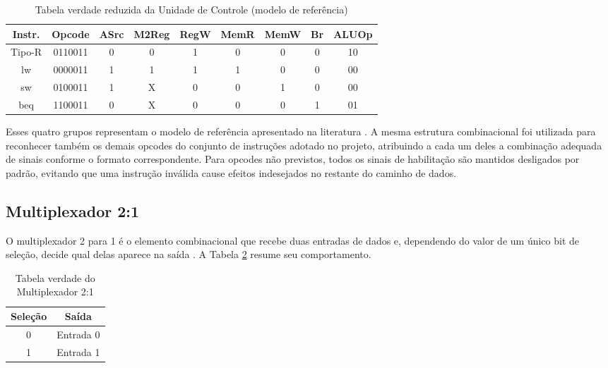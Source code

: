 \documentclass[conference]{IEEEtran}
\begin{document}
\begin{table}[!t]
\caption{Tabela verdade reduzida da Unidade de Controle (modelo de referência)}
\begin{center}
\scriptsize
\setlength{\tabcolsep}{3pt}
\begin{tabular}{c|c|c|c|c|c|c|c|c}
\hline \hline
\textbf{Instr.} & \textbf{Opcode} & \textbf{ASrc} & \textbf{M2Reg} & \textbf{RegW} & \textbf{MemR} & \textbf{MemW} & \textbf{Br} & \textbf{ALUOp} \\
\hline
Tipo-R & 0110011 & 0 & 0 & 1 & 0 & 0 & 0 & 10 \\
lw & 0000011 & 1 & 1 & 1 & 1 & 0 & 0 & 00 \\
sw & 0100011 & 1 & X & 0 & 0 & 1 & 0 & 00 \\
beq & 1100011 & 0 & X & 0 & 0 & 0 & 1 & 01 \\
\hline \hline
\end{tabular}
\end{center}
\label{tab:controle}
\end{table}

Esses quatro grupos representam o modelo de referência apresentado na literatura \cite{patterson2020computer}. A
mesma estrutura combinacional foi utilizada para reconhecer também os demais opcodes do conjunto de
instruções adotado no projeto, atribuindo a cada um deles a combinação adequada de sinais conforme o
formato correspondente. Para opcodes não previstos, todos os sinais de habilitação são mantidos desligados
por padrão, evitando que uma instrução inválida cause efeitos indesejados no restante do caminho de dados.

\subsection{Multiplexador 2:1}
O multiplexador 2 para 1 é o elemento combinacional que recebe
duas entradas de dados e, dependendo do valor de um único bit de seleção, decide qual delas aparece na
saída \cite{patterson2020computer}. A Tabela \ref{tab:mux} resume seu comportamento.

\begin{table}[!t]
\caption{Tabela verdade do Multiplexador 2:1}
\begin{center}
\begin{tabular}{c|c}
\hline \hline
\textbf{Seleção} & \textbf{Saída} \\
\hline
0 & Entrada 0 \\
1 & Entrada 1 \\
\hline \hline
\end{tabular}
\end{center}
\label{tab:mux}
\end{table}
\end{document}
